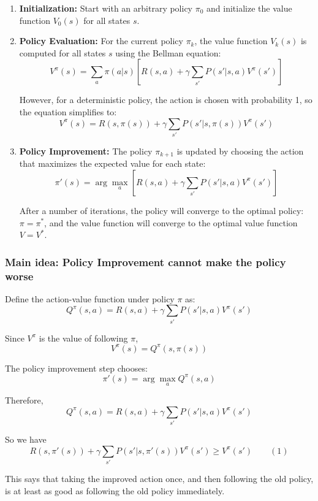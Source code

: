 \documentclass{scrartcl}
\theoremstyle{mytheoremstyle}
\theoremstyle{mytheoremstyle}
\theoremstyle{myproblemstyle}
\begin{document}
\begin{enumerate}
    \item \textbf{Initialization:} Start with an arbitrary policy $\pi_0$ and initialize the value function $V_0(s)$ for all states $s$.

    \item \textbf{Policy Evaluation:} For the current policy $\pi_k$, the value function $V_k(s)$ is computed for all states $s$ using the Bellman equation:
          \[
              V^{\pi}(s) = \sum_{a} \pi(a|s) \left[ R(s, a) + \gamma \sum_{s'} P(s'|s, a) V^{\pi}(s') \right]
          \]

          However, for a deterministic policy, the action is chosen with probability 1, so the equation simplifies to:
          \[
              V^{\pi}(s) = R(s, \pi(s)) + \gamma \sum_{s'} P(s'|s, \pi(s)) V^{\pi}(s')
          \]

    \item \textbf{Policy Improvement:} The policy $\pi_{k+1}$ is updated by choosing the action that maximizes the expected value for each state:
          \[
              \pi'(s) = \arg\max_{a} \left[ R(s, a) + \gamma \sum_{s'} P(s'|s, a) V^{\pi}(s') \right]
          \]

          After a number of iterations, the policy will converge to the optimal policy:  $\pi = \pi^*$, and the value function will converge to the optimal value function $V = V^*$.
\end{enumerate}

\subsubsection*{Main idea: Policy Improvement cannot make the policy worse}

Define the action-value function under policy $\pi$ as:
\[
    Q^{\pi}(s, a) = R(s, a) + \gamma \sum_{s'} P(s'|s, a) V^{\pi}(s')
\]

Since $V^{\pi}$ is the value of following $\pi$,
\[
    V^{\pi}(s) = Q^{\pi}(s, \pi(s))
\]

The policy improvement step chooses:
\[
    \pi'(s) = \arg\max_{a} Q^{\pi}(s, a)
\]

Therefore,
\[
    Q^{\pi}(s, a) = R(s, a) + \gamma \sum_{s'} P(s'|s, a) V^{\pi}(s')
\]

So we have
\[
    R(s, \pi' (s)) + \gamma \sum_{s'} P(s'|s, \pi'(s)) V^{\pi}(s') \ge V^{\pi}(s') \quad\quad (1)
\]

This says that taking the improved action once, and then following the old policy, is at least as good as following the old policy immediately.
\end{document}
